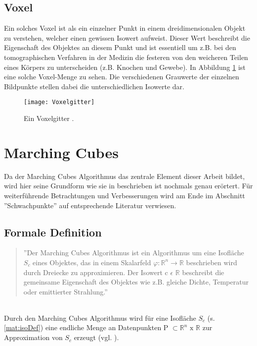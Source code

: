 \subsection{Voxel} 
Ein solches Voxel ist als ein einzelner Punkt in einem dreidimensionalen Objekt zu verstehen, welcher einen gewissen Isowert aufweist. Dieser Wert beschreibt die Eigenschaft des Objektes an diesem Punkt und ist essentiell um z.B. bei den tomographischen Verfahren in der Medizin die festeren von den weicheren Teilen eines Körpers zu unterscheiden (z.B. Knochen und Gewebe). In Abbildung \ref{fig:Voxelgitter} ist eine solche Voxel-Menge zu sehen. Die verschiedenen Grauwerte der einzelnen Bildpunkte stellen dabei die unterschiedlichen Isowerte dar.

\begin{figure}
	\centering
	\texttt{[image: Voxelgitter]}
	\caption{Ein Voxelgitter \citep{SeibtBak}.}
	\label{fig:Voxelgitter}
\end{figure}

\section{Marching Cubes}
Da der Marching Cubes Algorithmus das zentrale Element dieser Arbeit bildet, wird hier seine Grundform wie sie in \citep{MCAlgo} beschrieben ist nochmals genau erörtert. Für weiterführende Betrachtungen und Verbesserungen wird am Ende im Abschnitt ''Schwachpunkte'' auf entsprechende Literatur verwiesen.
\subsection{Formale Definition}
\begin{quote}
	''Der Marching Cubes Algorithmus ist ein Algorithmus um eine Isofläche $S_{c}$ eines Objektes, das in einem Skalarfeld  $\varphi : \mathbb{R}^{n} \rightarrow \mathbb{R }$ beschrieben wird durch Dreiecke zu approximieren. Der Isowert c $\epsilon$ $ \mathbb{ R} $ beschreibt die gemeinsame Eigenschaft des Objektes wie z.B. gleiche Dichte, Temperatur oder emittierter Strahlung.''
\end{quote} \citep{WollmannBak}\\

\noindent Durch den Marching Cubes Algorithmus wird für eine Isofläche $S_{c}$ (s. \ref{mat:isoDef})
eine endliche Menge an Datenpunkten P $\subset \mathbb{R}^{n} \text{ x } \mathbb{R}$ zur Approximation von $S_{c}$ erzeugt (vgl. \citep{VisualHandbook}).

